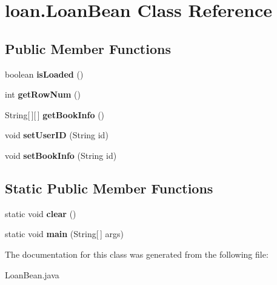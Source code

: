 \hypertarget{classloan_1_1_loan_bean}{}\section{loan.\+Loan\+Bean Class Reference}
\label{classloan_1_1_loan_bean}
\subsection*{Public Member Functions}
\begin{DoxyCompactItemize}
\item 
boolean {\bfseries is\+Loaded} ()\hypertarget{classloan_1_1_loan_bean_af8b0094d96ab6a310c078fcc93f5de50}{}\label{classloan_1_1_loan_bean_af8b0094d96ab6a310c078fcc93f5de50}

\item 
int {\bfseries get\+Row\+Num} ()\hypertarget{classloan_1_1_loan_bean_a877dd9a33be3fb24db21e31977e4330c}{}\label{classloan_1_1_loan_bean_a877dd9a33be3fb24db21e31977e4330c}

\item 
String\mbox{[}$\,$\mbox{]}\mbox{[}$\,$\mbox{]} {\bfseries get\+Book\+Info} ()\hypertarget{classloan_1_1_loan_bean_ac59567271b218b8a6a59eb7723964f64}{}\label{classloan_1_1_loan_bean_ac59567271b218b8a6a59eb7723964f64}

\item 
void {\bfseries set\+User\+ID} (String id)\hypertarget{classloan_1_1_loan_bean_a38f9f0a750e55cd377d34f5b9c4a9c0b}{}\label{classloan_1_1_loan_bean_a38f9f0a750e55cd377d34f5b9c4a9c0b}

\item 
void {\bfseries set\+Book\+Info} (String id)\hypertarget{classloan_1_1_loan_bean_a7c80ca228be4bd4438e4a4bef40dc0d0}{}\label{classloan_1_1_loan_bean_a7c80ca228be4bd4438e4a4bef40dc0d0}

\end{DoxyCompactItemize}
\subsection*{Static Public Member Functions}
\begin{DoxyCompactItemize}
\item 
static void {\bfseries clear} ()\hypertarget{classloan_1_1_loan_bean_ac5f11c145a3b4a73c97f82bdc3beb07d}{}\label{classloan_1_1_loan_bean_ac5f11c145a3b4a73c97f82bdc3beb07d}

\item 
static void {\bfseries main} (String\mbox{[}$\,$\mbox{]} args)\hypertarget{classloan_1_1_loan_bean_a7c98ca3abd92ebc7dde7117c1b9471d7}{}\label{classloan_1_1_loan_bean_a7c98ca3abd92ebc7dde7117c1b9471d7}

\end{DoxyCompactItemize}


The documentation for this class was generated from the following file\+:\begin{DoxyCompactItemize}
\item 
Loan\+Bean.\+java\end{DoxyCompactItemize}

